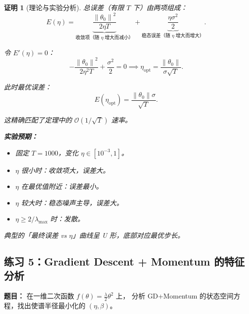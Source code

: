 \documentclass[12pt,a4paper]{ctexart}
\theoremstyle{definition}
\theoremstyle{plain}
\newtheorem*{proof*}{证明}
\newcommand{\norm}[1]{\left\lVert #1 \right\rVert}
\begin{document}
\begin{proof*}[理论与实验分析]
总误差（有限 $T$ 下）由两项组成：
\begin{equation}
  E(\eta) = \underbrace{\frac{\norm{\theta_0}^2}{2\eta T}}_{\text{收敛项（随 $\eta$ 增大而减小）}}
  + \underbrace{\frac{\eta\sigma^2}{2}}_{\text{稳态误差（随 $\eta$ 增大而增大）}}.
\end{equation}

令 $E'(\eta) = 0$：
\begin{equation}
  -\frac{\norm{\theta_0}^2}{2\eta^2 T} + \frac{\sigma^2}{2} = 0
  \implies \boxed{\eta_{\text{opt}} = \frac{\norm{\theta_0}}{\sigma\sqrt{T}}.}
\end{equation}

此时最优误差：
\begin{equation}
  \boxed{E(\eta_{\text{opt}}) = \frac{\norm{\theta_0}\sigma}{\sqrt{T}}.}
\end{equation}

这精确匹配了定理中的 $\mathcal{O}(1/\sqrt{T})$ 速率。

\medskip
\noindent\textbf{实验预期：}

\begin{itemize}
  \item 固定 $T = 1000$，变化 $\eta \in [10^{-3}, 1]$。
  \item $\eta$ 很小时：收敛项大，误差大。
  \item $\eta$ 在最优值附近：误差最小。
  \item $\eta$ 较大时：稳态噪声主导，误差大。
  \item $\eta \ge 2/\lambda_{\max}$ 时：发散。
\end{itemize}

典型的「最终误差 vs $\eta$」曲线呈 U 形，底部对应最优步长。

\end{proof*}

\subsection{练习 5：Gradient Descent + Momentum 的特征分析}

\textbf{题目：} 在一维二次函数 $f(\theta) = \frac{\lambda}{2}\theta^2$ 上，
分析 GD+Momentum 的状态空间方程，找出使谱半径最小化的 $(\eta, \beta)$。
\end{document}
